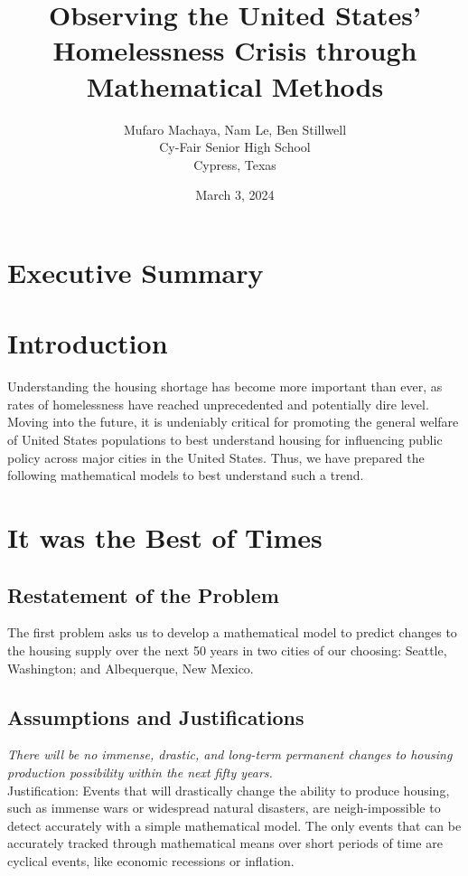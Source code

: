 \documentclass[12pt]{article}
\title{Observing the United States' Homelessness Crisis through Mathematical Methods}
\author{Mufaro Machaya, Nam Le, Ben Stillwell \\ Cy-Fair Senior High School \\ Cypress, Texas}
\date{March 3, 2024}
\begin{document}
\newpage

\section*{Executive Summary}
\blindtext

\maketitle
\newpage
\tableofcontents

\newpage

\section{Introduction}
Understanding the housing shortage has become more important than ever, as rates of homelessness have reached
unprecedented and potentially dire level\cite{NPR-ABGC-2022}. Moving into the future, it is
undeniably critical for promoting the general welfare of United States populations to best understand housing for
influencing public policy across major cities in the United States. Thus, we have prepared the following mathematical
models to best understand such a trend.

\newpage

\section{It was the Best of Times}

\subsection{Restatement of the Problem}
The first problem asks us to develop a mathematical model to predict changes to the housing supply over the next 50
years in two cities of our choosing: Seattle, Washington; and Albequerque, New Mexico.

\subsection{Assumptions and Justifications}

\textit{There will be no immense, drastic, and long-term permanent changes to housing production possibility
within the next fifty years.} \\

\noindent
Justification: Events that will drastically change the ability to produce housing, such as immense wars or widespread
natural disasters, are neigh-impossible to detect accurately with a simple mathematical model. The only events that can
be accurately tracked through mathematical means over short periods of time are cyclical events, like economic
recessions or inflation. \\
\end{document}
